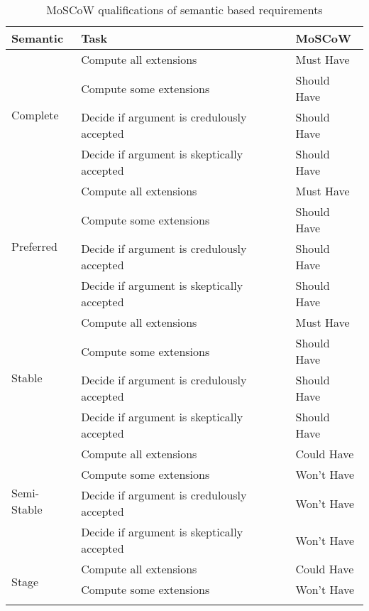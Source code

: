 \begin{longtable}{|l|l|l|}
	\caption{MoSCoW qualifications of semantic based requirements}
	\label{table:moscowSemanticRequirements} \\
	\hline
	\textbf{Semantic}            & \textbf{Task}                                   & \textbf{MoSCoW} \\ \hline \hline
	\multirow{4}{*}{Complete}    & Compute all extensions                           & Must Have       \\ \cline{2-3} 
	& Compute some extensions                          & Should Have     \\ \cline{2-3} 
	& Decide if argument is credulously accepted & Should Have     \\ \cline{2-3} 
	& Decide if argument is skeptically accepted & Should Have     \\ \hline
	\multirow{4}{*}{Preferred}   & Compute all extensions                           & Must Have       \\ \cline{2-3} 
	& Compute some extensions                          & Should Have     \\ \cline{2-3} 
	& Decide if argument is credulously accepted & Should Have     \\ \cline{2-3} 
	& Decide if argument is skeptically accepted & Should Have     \\ \hline
	\multirow{4}{*}{Stable}      & Compute all extensions                           & Must Have       \\ \cline{2-3} 
	& Compute some extensions                          & Should Have     \\ \cline{2-3} 
	& Decide if argument is credulously accepted & Should Have     \\ \cline{2-3} 
	& Decide if argument is skeptically accepted & Should Have     \\ \hline
	\multirow{4}{*}{Semi-Stable} & Compute all extensions                           & Could Have      \\ \cline{2-3} 
	& Compute some extensions                          & Won't Have      \\ \cline{2-3} 
	& Decide if argument is credulously accepted & Won't Have      \\ \cline{2-3} 
	& Decide if argument is skeptically accepted & Won't Have      \\ \hline
	\multirow{4}{*}{Stage}       & Compute all extensions                           & Could Have      \\ \cline{2-3} 
	& Compute some extensions                          & Won't Have      \\ \cline{2-3} 

\end{longtable}
